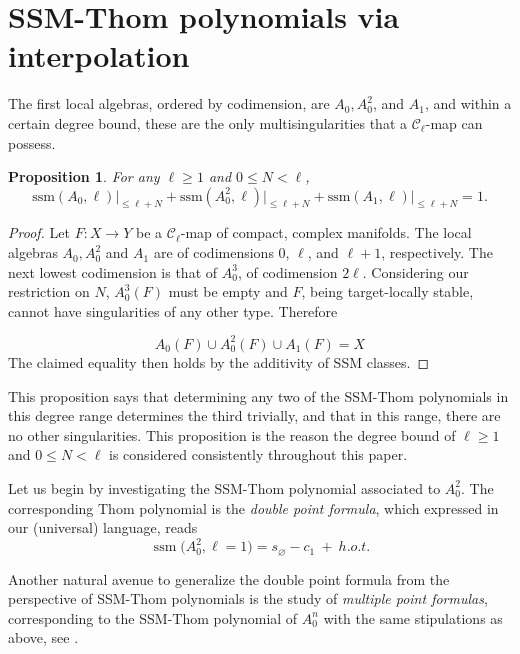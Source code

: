 \documentclass[11pt]{article}
\theoremstyle{plain}
\newtheorem{proposition}[fact]{Proposition}
\theoremstyle{definition}
\theoremstyle{definition}
\DeclareMathOperator{\ssm}{ssm}
\let\emptyset\varnothing
\begin{document}
\section{SSM-Thom polynomials via interpolation}\label{main}

The first local algebras, ordered by codimension, are $A_0,A_0^2$, and $A_1$, and within a certain degree bound, these are the only multisingularities that a $\mathcal C_\ell$-map can possess.

\begin{proposition}\label{local algs}
For any $\ell\geq 1$ and $0\leq N<\ell$, 
\[
\text{ssm}(A_0,\ell)\big|_{\leq \ell+N} + \text{ssm}(A_0^2,\ell)\big|_{\leq \ell+N}+\text{ssm}(A_1,\ell)\big|_{\leq\ell+ N}=1.
\]
\end{proposition}

\begin{proof}
Let $F:X \to Y$ be a $\mathcal C_\ell$-map of compact, complex manifolds. The local algebras $A_0,A_0^2$ and $A_1$ are of codimensions 0, $\ell$, and $\ell+1$, respectively. The next lowest codimension is that of $A_0^3$, of codimension $2\ell$. Considering our restriction on $N$, $A_0^3(F)$ must be empty and $F$, being target-locally stable, cannot have singularities of any other type. Therefore

\[
A_0(F)\cup A_0^2(F)\cup A_1(F) = X
\]
The claimed equality then holds by the additivity of SSM classes. 
\end{proof}

This proposition says that determining any two of the SSM-Thom polynomials in this degree range determines the third trivially, and that in this range, there are no other singularities. This proposition is the reason the degree bound of $\ell\geq 1$ and $0\leq N < \ell$ is considered consistently throughout this paper. 

Let us begin by investigating the SSM-Thom polynomial associated to $A_0^2$. The corresponding Thom polynomial is the \textit{double point formula}, which expressed in our (universal) language, reads
\[
\ssm\big(A_0^2,\ell=1\big) = s_\emptyset-c_1\ +\ h.o.t.
\]

Another natural avenue to generalize the double point formula from the perspective of SSM-Thom polynomials is the study of \textit{multiple point formulas}, corresponding to the SSM-Thom polynomial of $A_0^n$ with the same stipulations as above, see \cite{rim-multi-pt}.
\end{document}
